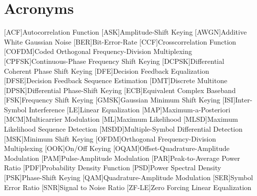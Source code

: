 \chapter{Acronyms}
\begin{acronym}[DCPSK]
    [ACF]{Autocorrelation Function}
    [ASK]{Amplitude-Shift Keying}
    [AWGN]{Additive White Gaussian Noise}
    [BER]{Bit-Error-Rate}
    [CCF]{Crosscorrelation Function}
    [COFDM]{Coded Orthogonal Frequency-Division Multiplexing}
    [CPFSK]{Continuous-Phase Frequency Shift Keying}
    [DCPSK]{Differential Coherent Phase Shift Keying}
    [DFE]{Decision Feedback Equalization}
    [DFSE]{Decision Feedback Sequence Estimation}
    [DMT]{Discrete Multitone}
    [DPSK]{Differential Phase-Shift Keying}
    [ECB]{Equivalent Complex Baseband}
    [FSK]{Frequency Shift Keying}
    [GMSK]{Gaussian Minimum Shift Keying}
    [ISI]{Inter-Symbol Interference}
    [LE]{Linear Equalization}
    [MAP]{Maximum-a-Posteriori}
    [MCM]{Multicarrier Modulation}
    [ML]{Maximum Likelihood}
    [MLSD]{Maximum Likelihood Sequence Detection}
    [MSDD]{Multiple-Symbol Differential Detection}
    [MSK]{Minimum Shift Keying}
    [OFDM]{Orthogonal Frequency-Division Multiplexing}
    [OOK]{On/Off Keying}
    [OQAM]{Offset-Quadrature-Amplitude Modulation}
    [PAM]{Pulse-Amplitude Modulation}
    [PAR]{Peak-to-Average Power Ratio}
    [PDF]{Probability Density Function}
    [PSD]{Power Spectral Density}
    [PSK]{Phase-Shift Keying}
    [QAM]{Quadrature-Amplitude Modulation}
    [SER]{Symbol Error Ratio}
    [SNR]{Signal to Noise Ratio}
    [ZF-LE]{Zero Forcing Linear Equalization}
\end{acronym}
